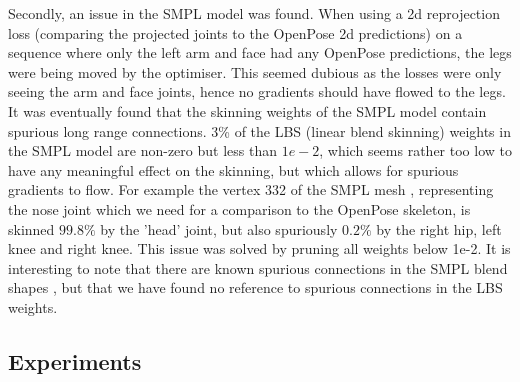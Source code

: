 Secondly, an issue in the SMPL model was found. When using a 2d reprojection loss (comparing the projected joints to the OpenPose 2d predictions) on a sequence where only the left arm and face had any OpenPose predictions, the legs were being moved by the optimiser. This seemed dubious as the losses were only seeing the arm and face joints, hence no gradients should have flowed to the legs. It was eventually found that the skinning weights of the SMPL model \cite{SMPL} contain spurious long range connections. 3\% of the LBS (linear blend skinning) weights in the SMPL model are non-zero but less than $1e-2$, which seems rather too low to have any meaningful effect on the skinning, but which allows for spurious gradients to flow. For example the vertex 332 of the SMPL mesh \cite{SMPL_op_joints}, representing the nose joint which we need for a comparison to the OpenPose skeleton, is skinned $99.8\%$ by the 'head' joint, but also spuriously $0.2\%$ by the right hip, left knee and right knee. This issue was solved by pruning all weights below 1e-2. It is interesting to note that there are known spurious connections in the SMPL blend shapes \cite{STAR}, but that we have found no reference to spurious connections in the LBS weights. 
\\













\subsection{Experiments}

